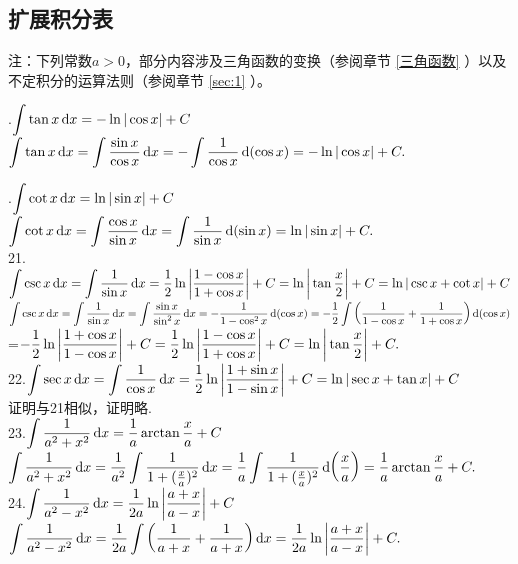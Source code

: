 \subsection{扩展积分表}
注：下列常数$a>0$，部分内容涉及三角函数的变换（参阅章节 \ref{三角函数} ）以及不定积分的运算法则（参阅章节 \ref{sec:1} ）。
\newpage 

.\enspace $\displaystyle\int \tan x \,{\rm{d}} x=-\ln |\cos x|+C$
\vspace{1em}\\ \proof $\displaystyle\int \tan x \,{\rm{d}} x=\int \frac{\sin x}{\cos x} \,{\rm{d}} x=-\int\frac{1}{\cos x} \,{\rm{d}} (\cos x)=-\ln|\cos x|+C.$

.\enspace $\displaystyle\int \cot x \,{\rm{d}} x=\ln |\sin x|+C$\\[0.5em]
 \proof $\displaystyle\int \cot x \,{\rm{d}} x=\int \frac{\cos x}{\sin x} \,{\rm{d}} x=\int\frac{1}{\sin x} \,{\rm{d}} (\sin x)=\ln|\sin x|+C.$\\[1em]
21.\enspace $\displaystyle\int \csc x \,{\rm{d}} x=\int\frac{1}{\sin x} \,{\rm{d}} x=\frac{1}{2}\ln \bigg|\frac{1-\cos x}{1+\cos x}\bigg|+C=\ln\bigg |\tan \frac{x}{2}\bigg|+C=\ln|\csc x+\cot x|+C
$\\[1em]
\proof $\displaystyle\int \csc x \,{\rm{d}} x=\int \frac{1}{\sin x} \,{\rm{d}} x=\int\frac{\sin x}{\sin^2 x} \,{\rm{d}} x=-\frac{1}{1-\cos^2 x} \,{\rm{d}} (\cos x)=-\frac{1}{2}\int \bigg(\frac{1}{1-\cos x}+\frac{1}{1+\cos x}\bigg) \,{\rm{d}}(\cos x)$\\[0.5em]
\hspace*{9.5em}=$-\displaystyle\frac{1}{2}\ln \bigg|\displaystyle\frac{1+\cos x}{1-\cos x}\bigg|+C=\displaystyle\frac{1}{2}\ln \bigg|\displaystyle\frac{1-\cos x}{1+\cos x}\bigg|+C=\ln\bigg|\tan \frac{x}{2}\bigg|+C. $\\[1em]
22.\enspace $\displaystyle\int \sec x \,{\rm{d}} x=\int\frac{1}{\cos x} \,{\rm{d}} x=\frac{1}{2}\ln \bigg|\frac{1+\sin x}{1-\sin x}\bigg|+C=\ln|\sec x+\tan x|+C
$\\[1em]
\proof 证明与21相似，证明略.\\[1em]
23.\enspace $\displaystyle\int\frac{1}{a^2+x^2} \,{\rm{d}} x=\frac{1}{a}\arctan\frac{x}{a}+C$\\[1em]
\proof $\displaystyle\int\frac{1}{a^2+x^2} \,{\rm{d}} x=\frac{1}{a^2}\int\frac{1}{1+(\frac{x}{a})^2} \,{\rm{d}} x=\frac{1}{a}\int\frac{1}{1+(\frac{x}{a})^2}\,{\rm{d}}\bigg(\frac{x}{a}\bigg)=\frac{1}{a}\arctan\frac{x}{a}+C.$
\\[1em]
24.\enspace $\displaystyle\int\frac{1}{a^2-x^2} \,{\rm{d}} x=\frac{1}{2a}\ln \bigg|\frac{a+x}{a-x}\bigg|+C$\\[1em]
\proof $\displaystyle\int\frac{1}{a^2-x^2} \,{\rm{d}} x=\frac{1}{2a}\int\bigg(\frac{1}{a+x}+\frac{1}{a+x}\bigg) \,{\rm{d}} x=\frac{1}{2a}\ln \bigg|\frac{a+x}{a-x}\bigg|+C.$\\[1em]
